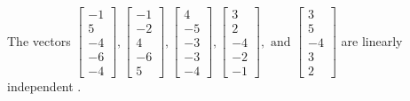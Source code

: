 \begin{exercise}
\begin{exerciseStatement}
  \end{exerciseStatement}
  \begin{exerciseAnswer}
   The vectors \(\left[\begin{array}{r}
-1 \\
5 \\
-4 \\
-6 \\
-4
\end{array}\right] , \left[\begin{array}{r}
-1 \\
-2 \\
4 \\
-6 \\
5
\end{array}\right] , \left[\begin{array}{r}
4 \\
-5 \\
-3 \\
-3 \\
-4
\end{array}\right] , \left[\begin{array}{r}
3 \\
2 \\
-4 \\
-2 \\
-1
\end{array}\right] , \text{ and } \left[\begin{array}{r}
3 \\
5 \\
-4 \\
3 \\
2
\end{array}\right]\) are 
  	 linearly independent  .
  


  \end{exerciseAnswer}
\end{exercise}